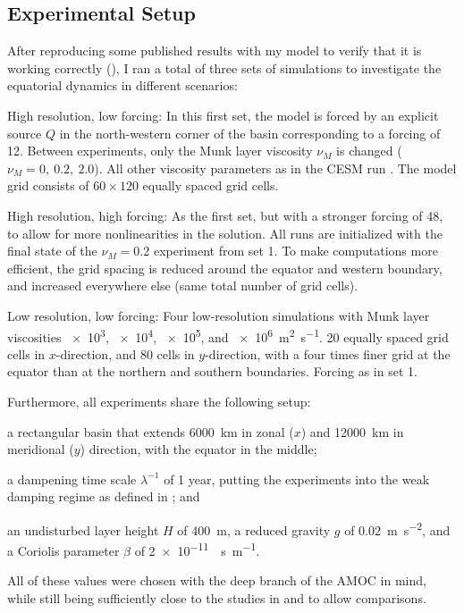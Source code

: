 \subsection{Experimental Setup}
\label{sec:sw-experiments}
After reproducing some published results with my model to verify that it is working correctly (), I ran a total of three sets of simulations to investigate the equatorial dynamics in different scenarios:
%
\begin{enum} 
\item High resolution, low forcing: In this first set, the model is forced by an explicit source \(Q\) in the north-western corner of the basin corresponding to a forcing of \SI{12}{\sv}. Between experiments, only the Munk layer viscosity \(\nu_M\) is changed (\(\nu_M = 0,\ 0.2,\ 2.0 \)). All other viscosity parameters as in the \ac{CESM} run . The model grid consists of \(60 \times 120\) equally spaced  grid cells.
\item High resolution, high forcing: As the first set, but with a stronger forcing of \SI{48}{\sv}, to allow for more nonlinearities in the solution. All runs are initialized with the final state of the \(\nu_M = 0.2\) experiment from set 1. To make computations more efficient, the grid spacing is reduced around the equator and western boundary, and increased everywhere else (same total number of grid cells).
\item Low resolution, low forcing: Four low-resolution simulations with Munk layer viscosities \num{e3}, \num{e4}, \num{e5}, and \SI{e6}{\metre\squared\per\second}. 20 equally spaced grid cells in \(x\)-direction, and 80 cells in \(y\)-direction, with a four times finer grid at the equator than at the northern and southern boundaries. Forcing as in set 1.
\end{enum}
%
Furthermore, all experiments share the following setup:
%
\begin{items}
	\item a rectangular basin that extends \SI{6000}{\kilo\metre} in zonal (\(x\)) and \SI{12000}{\kilo\metre} in meridional (\(y\)) direction, with the equator in the middle;
	\item a dampening time scale \(\lambda^{-1}\) of 1 year, putting the experiments into the weak damping regime as defined in \cite{greatbatch}; and
	\item an undisturbed layer height \(H\) of \SI{400}{\metre}, a reduced gravity \(g\) of \SI{0.02}{\metre\per\second\squared}, and a Coriolis parameter \(\beta\) of \SI{2e-11}{\per\second\per\metre}.
\end{items}
%
All of these values were chosen with the deep branch of the \ac{AMOC} in mind, while still being sufficiently close to the studies in \cite{killworth} and \cite{greatbatch} to allow comparisons.


